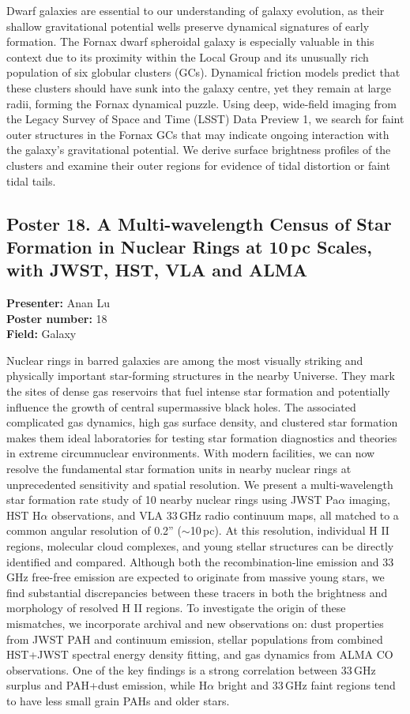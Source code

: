 Dwarf galaxies are essential to our understanding of galaxy evolution, as their shallow gravitational potential wells preserve dynamical signatures of early formation. The Fornax dwarf spheroidal galaxy is especially valuable in this context due to its proximity within the Local Group and its unusually rich population of six globular clusters (GCs). Dynamical friction models predict that these clusters should have sunk into the galaxy centre, yet they remain at large radii, forming the Fornax dynamical puzzle. Using deep, wide-field imaging from the Legacy Survey of Space and Time (LSST) Data Preview 1, we search for faint outer structures in the Fornax GCs that may indicate ongoing interaction with the galaxy's gravitational potential. We derive surface brightness profiles of the clusters and examine their outer regions for evidence of tidal distortion or faint tidal tails.

\hypertarget{poster-abstract-talk-122}{}\label{poster-abstract-page-talk-122}
\subsection*{Poster 18. A Multi-wavelength Census of Star Formation in Nuclear Rings at 10\,pc Scales, with JWST, HST, VLA and ALMA}
\textbf{Presenter:} Anan Lu\\
\textbf{Poster number:} 18\\
\textbf{Field:} Galaxy

Nuclear rings in barred galaxies are among the most visually striking and physically important star-forming structures in the nearby Universe. They mark the sites of dense gas reservoirs that fuel intense star formation and potentially influence the growth of central supermassive black holes. The associated complicated gas dynamics, high gas surface density, and clustered star formation makes them ideal laboratories for testing star formation diagnostics and theories in extreme circumnuclear environments. With modern facilities, we can now resolve the fundamental star formation units in nearby nuclear rings at unprecedented sensitivity and spatial resolution. We present a multi-wavelength star formation rate study of 10 nearby nuclear rings using JWST Pa$\alpha$ imaging, HST H$\alpha$ observations, and VLA 33\,GHz radio continuum maps, all matched to a common angular resolution of 0.2'' ($\sim$10\,pc). At this resolution, individual H II regions, molecular cloud complexes, and young stellar structures can be directly identified and compared. Although both the recombination-line emission and 33\,GHz free-free emission are expected to originate from massive young stars, we find substantial discrepancies between these tracers in both the brightness and morphology of resolved H II regions. To investigate the origin of these mismatches, we incorporate archival and new observations on: dust properties from JWST PAH and continuum emission, stellar populations from combined HST+JWST spectral energy density fitting, and gas dynamics from ALMA CO observations. One of the key findings is a strong correlation between 33\,GHz surplus and PAH+dust emission, while H$\alpha$ bright and 33\,GHz faint regions tend to have less small grain PAHs and older stars.

